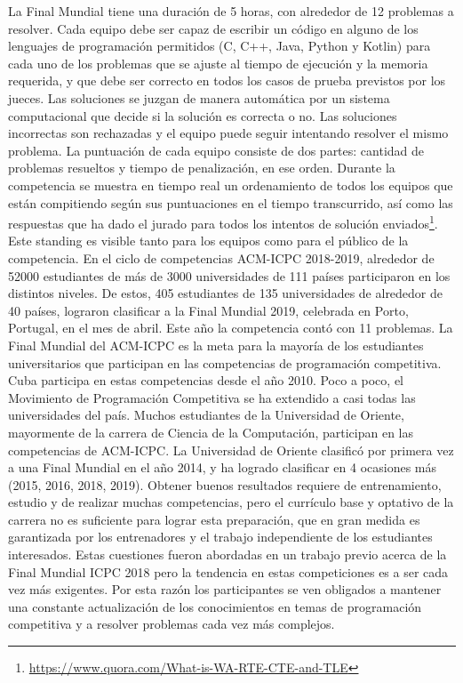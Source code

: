 \documentclass{report}
\begin{document}
La Final Mundial tiene una duraci\'on de 5 horas, con alrededor de 12 problemas a resolver.
Cada equipo debe ser capaz de escribir un c\'odigo en alguno de los lenguajes de programaci\'on
permitidos (C, C++, Java, Python y Kotlin) para cada uno de los problemas que se ajuste
al tiempo de ejecuci\'on y la memoria requerida, y que debe ser correcto en todos los casos
de prueba previstos por los jueces. Las soluciones se juzgan de manera autom\'atica por un
sistema computacional que decide si la soluci\'on es correcta o no. Las soluciones incorrectas son
rechazadas y el equipo puede seguir intentando resolver el mismo problema. La puntuaci\'on de
cada equipo consiste de dos partes: cantidad de problemas resueltos y tiempo de penalizaci\'on,
en ese orden. Durante la competencia se muestra en tiempo real un ordenamiento de todos los
equipos que est\'an compitiendo seg\'un sus puntuaciones en el tiempo transcurrido, as\'i como las
respuestas que ha dado el jurado para todos los intentos de soluci\'on enviados\footnote{\hyperlink{quora}{https://www.quora.com/What-is-WA-RTE-CTE-and-TLE}}. Este standing
es visible tanto para los equipos como para el p\'ublico de la competencia.
En el ciclo de competencias ACM-ICPC 2018-2019, alrededor de 52000 estudiantes de m\'as de 3000 universidades
de 111 pa\'ises participaron en los distintos niveles. De estos, 405 estudiantes de 135 universidades
de alrededor de 40 pa\'ises, lograron clasificar a la Final Mundial 2019, celebrada en Porto, Portugal,
en el mes de abril. Este a\~no la competencia cont\'o con 11 problemas.
La Final Mundial del ACM-ICPC es la meta para la mayor\'ia de los estudiantes universitarios que participan en las competencias de programaci\'on competitiva. Cuba participa en estas
competencias desde el a\~no 2010. Poco a poco, el Movimiento de Programaci\'on Competitiva se
ha extendido a casi todas las universidades del pa\'is. Muchos estudiantes de la Universidad de Oriente, mayormente de la carrera de Ciencia de la Computaci\'on, participan en las competencias de
ACM-ICPC. La Universidad de Oriente clasific\'o por primera vez a una Final Mundial en el a\~no
2014, y ha logrado clasificar en 4 ocasiones m\'as (2015, 2016, 2018, 2019).
Obtener buenos resultados requiere de entrenamiento, estudio y de realizar muchas competencias, pero el curr\'iculo base y optativo de la carrera no es suficiente para lograr esta preparaci\'on, que en gran medida es garantizada por los entrenadores y el trabajo independiente de los
estudiantes interesados. Estas cuestiones fueron abordadas en un trabajo previo acerca de la Final Mundial ICPC 2018\cite{Aurora} pero la tendencia en estas competiciones es a ser cada vez m\'as exigentes. Por esta raz\'on los participantes se ven obligados a mantener una constante actualizaci\'on de los conocimientos en temas de programaci\'on competitiva y a resolver problemas cada vez m\'as complejos.\\[0.1cm]
\end{document}
